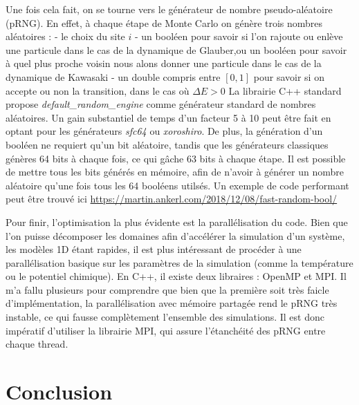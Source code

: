     Une fois cela fait, on se tourne vers le générateur de nombre pseudo-aléatoire (pRNG). En effet, à chaque étape de Monte Carlo on génère trois nombres aléatoires : 
    - le choix du site $i$
    - un booléen pour savoir si l'on rajoute ou enlève une particule dans le cas de la dynamique de Glauber,ou  un booléen pour savoir à quel plus proche voisin nous alons donner une particule dans le cas de la dynamique de Kawasaki
    - un double compris entre $[0,1]$ pour savoir si on accepte ou non la transition, dans le cas où $\Delta E \greater 0$
	La librairie C++ standard propose \textit{default\_random\_engine} comme générateur standard de nombres aléatoires. Un gain substantiel de temps d'un facteur 5 à 10 peut être fait en optant pour les générateurs \textit{sfc64} ou \textit{xoroshiro}. De plus, la génération d'un booléen ne requiert qu'un bit aléatoire, tandis que les générateurs classiques génères 64 bits à chaque fois, ce qui gâche 63 bits à chaque étape. Il est possible de mettre tous les bits générés en mémoire, afin de n'avoir à générer un nombre aléatoire qu'une fois tous les 64 booléens utilsés. Un exemple de code performant peut être trouvé ici
	 \url{https://martin.ankerl.com/2018/12/08/fast-random-bool/} 

    Pour finir, l'optimisation la plus évidente est la parallélisation du code. Bien que l'on puisse décomposer les domaines afin d'accélérer la simulation d'un système, les modèles 1D étant rapides, il est plus intéressant de procéder à une parallélisation basique sur les paramètres de la simulation (comme la température ou le potentiel chimique). En C++, il existe deux libraires : OpenMP et MPI. Il m'a fallu plusieurs pour comprendre que bien que la première soit très faicle d'implémentation, la parallélisation avec mémoire partagée rend le pRNG très instable, ce qui fausse complètement l'ensemble des simulations. Il est donc impératif d'utiliser la librairie MPI, qui assure l'étanchéité des pRNG entre chaque thread.
		
\section{Conclusion}

